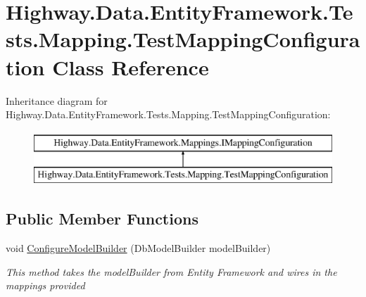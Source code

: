 \hypertarget{class_highway_1_1_data_1_1_entity_framework_1_1_tests_1_1_mapping_1_1_test_mapping_configuration}{\section{Highway.\-Data.\-Entity\-Framework.\-Tests.\-Mapping.\-Test\-Mapping\-Configuration Class Reference}
\label{class_highway_1_1_data_1_1_entity_framework_1_1_tests_1_1_mapping_1_1_test_mapping_configuration}
}
Inheritance diagram for Highway.\-Data.\-Entity\-Framework.\-Tests.\-Mapping.\-Test\-Mapping\-Configuration\-:\begin{figure}[H]
\begin{center}
\leavevmode
\includegraphics[height=2.000000cm]{class_highway_1_1_data_1_1_entity_framework_1_1_tests_1_1_mapping_1_1_test_mapping_configuration}
\end{center}
\end{figure}
\subsection*{Public Member Functions}
\begin{DoxyCompactItemize}
\item 
void \hyperlink{class_highway_1_1_data_1_1_entity_framework_1_1_tests_1_1_mapping_1_1_test_mapping_configuration_a4e9752011d4f872e145e382f5e46b0e1}{Configure\-Model\-Builder} (Db\-Model\-Builder model\-Builder)
\begin{DoxyCompactList}\small\item\em This method takes the model\-Builder from Entity Framework and wires in the mappings provided \end{DoxyCompactList}\end{DoxyCompactItemize}


